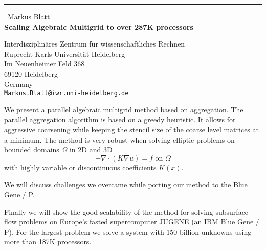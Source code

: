 \documentclass{report}
\begin{document}
\begin{center}
\rule{6in}{1pt} \
{\large Markus Blatt \\
{\bf Scaling Algebraic Multigrid to over 287K processors}}

Interdisziplinäres Zentrum für wissenschaftliches Rechnen \\ Ruprecht-Karls-Universität Heidelberg \\ Im Neuenheimer Feld 368 \\ 69120 Heidelberg \\ Germany
\\
{\tt Markus.Blatt@iwr.uni-heidelberg.de}\end{center}

We present a parallel algebraic multigrid method based on aggregation.
The parallel aggregation algorithm is based on a greedy heuristic. It
allows for aggressive coarsening while keeping the stencil size of the
coarse level matrices at a minimum. The method is very robust when
solving elliptic problems on bounded domains $\Omega$ in 2D and 3D
$$
-\nabla \cdot (K \nabla u) = f \text{ on } \Omega
$$
with highly variable or discontinuous coefficients $K(x)$.

We will discuss challenges we overcame while porting our method to the Blue Gene / P.

Finally we will show the good scalability of the method for solving
subsurface flow problems on Europe's fasted supercomputer JUGENE (an IBM
Blue Gene / P). For the largest problem we solve a system with 150
billion unknowns using more than 187K processors.
\end{document}
